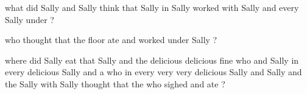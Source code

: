 \documentclass[10pt]{article}
\begin{document}
\begin{enumerate}
\begin{enumerate}
{\vspace{0.2cm}

what did Sally and Sally think that Sally in Sally worked with Sally and every Sally under ?

\vspace{0.2cm}

who thought that the floor ate and worked under Sally ?

\vspace{0.2cm}

where did Sally eat that Sally and the delicious delicious fine who and Sally in every delicious Sally and a who in every very very delicious Sally and Sally and the Sally with Sally thought that the who sighed and ate ?



}

\end{enumerate}
\end{enumerate}
\end{document}
